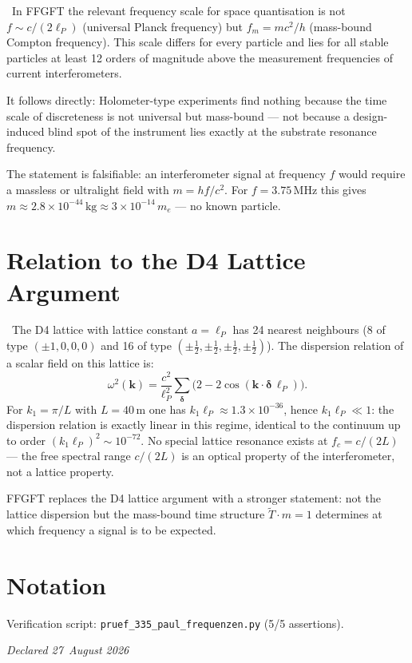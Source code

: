 \begin{kernbox}[title={Conclusion: Why Holometer-type experiments find no signal}]
\KM\ In FFGFT the relevant frequency scale for space quantisation is not
$f \sim c/(2\ell_P)$ (universal Planck frequency) but $f_m = mc^2/h$
(mass-bound Compton frequency). This scale differs for every particle and
lies for all stable particles at least 12 orders of magnitude above the
measurement frequencies of current interferometers.

It follows directly: Holometer-type experiments find nothing because the
time scale of discreteness is not universal but mass-bound --- not because
a design-induced blind spot of the instrument lies exactly at the substrate
resonance frequency.

The statement is falsifiable: an interferometer signal at frequency $f$
would require a massless or ultralight field with $m = hf/c^2$. For
$f = 3.75\,\text{MHz}$ this gives $m \approx 2.8\times10^{-44}\,\text{kg}
\approx 3\times10^{-14}\,m_e$ --- no known particle.
\end{kernbox}

\section{Relation to the D4 Lattice Argument}

\KM\ The D4 lattice with lattice constant $a=\ell_P$ has 24 nearest neighbours
(8 of type $(\pm1,0,0,0)$ and 16 of type
$(\pm\tfrac{1}{2},\pm\tfrac{1}{2},\pm\tfrac{1}{2},\pm\tfrac{1}{2})$).
The dispersion relation of a scalar field on this lattice is:
\begin{equation}
\omega^2(\mathbf{k}) = \frac{c^2}{\ell_P^2}\sum_{\symbf{\delta}}
\bigl(2-2\cos(\mathbf{k}\cdot\symbf{\delta}\,\ell_P)\bigr).
\end{equation}
For $k_1 = \pi/L$ with $L=40\,\text{m}$ one has
$k_1\ell_P \approx 1.3\times10^{-36}$, hence $k_1\ell_P \ll 1$: the
dispersion relation is exactly linear in this regime, identical to the
continuum up to order $(k_1\ell_P)^2\sim10^{-72}$. No special lattice
resonance exists at $f_c = c/(2L)$ --- the free spectral range $c/(2L)$
is an optical property of the interferometer, not a lattice property.

FFGFT replaces the D4 lattice argument with a stronger statement: not the
lattice dispersion but the mass-bound time structure $\tilde{T}\cdot m=1$
determines at which frequency a signal is to be expected.

\section*{Notation}



Verification script: \texttt{pruef\_335\_paul\_frequenzen.py} (5/5 assertions).

\emph{Declared 27~August 2026}
